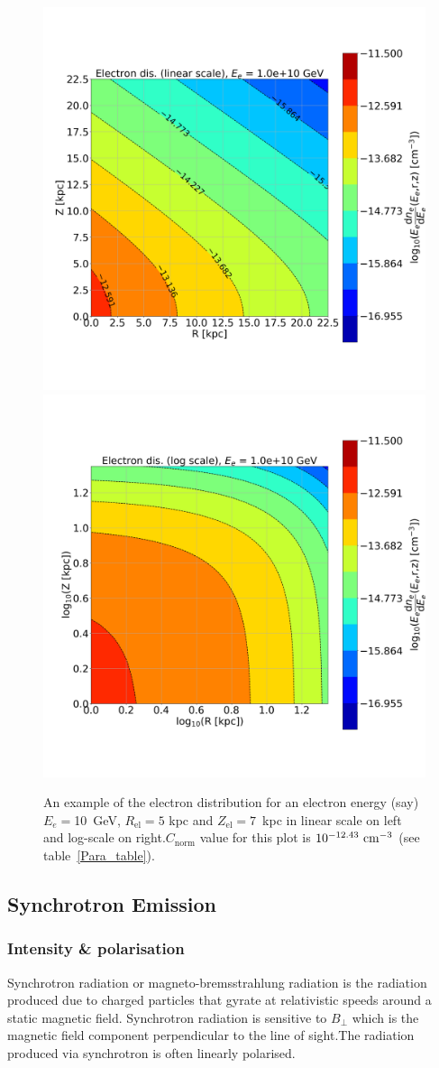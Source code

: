 \documentclass[usenatbib]{mnras}
\newcommand{\Andrew}[1]{\textcolor{dg}{#1}}
\begin{document}
\begin{figure}
\centering
\includegraphics[width=0.49\linewidth]{Images/Linear_EdNdE.png}%
\includegraphics[width = 0.49\linewidth]{Images/Log_EdNdE.png}
\caption{An example of the electron distribution for an electron energy (say) $E_e = $10~GeV, $R_{\mathrm{el}} = 5$ kpc and $Z_{\mathrm{el}} = 7$~kpc in linear scale on left and log-scale on right.$C_\mathrm{norm}$ value for this plot is $10^{-12.43}~{\rm cm}^{-3}$ (see table~\ref{Para_table}).}  %
\label{fig:electron_density}
\end{figure}


\subsection{Synchrotron Emission}\label{Synchrotron_theory}

\subsubsection{Intensity \& polarisation}
Synchrotron radiation or magneto-bremsstrahlung radiation is the radiation produced due to charged particles that gyrate at relativistic speeds around a static magnetic field. Synchrotron radiation is sensitive to $B_{\perp}$ which is the magnetic field component perpendicular to the line of sight.The radiation produced via synchrotron is often linearly polarised. 
\end{document}
